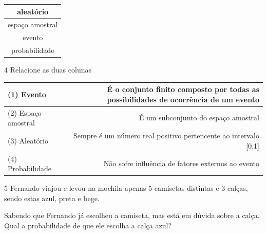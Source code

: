 \begin{escolha}
\begin{escolha}
\begin{escolha}
\begin{escolha}
{\begin{boxmedio}
\begin{boxpeq}
\begin{q°}
\begin{boxmedio}
\begin{boxpeq}
\begin{boxpeq}
\begin{boxmedio}
\begin{boxmedio}
\begin{boxmedio}
\begin{largebox}
\begin{boxmedio}
{\begin{enumerate}
\begin{boxpeq}
{\begin{boxpeq}
\begin{boxpeq}
\begin{boxmedio}
\begin{boxpeq}
\begin{boxpeq}
\begin{boxpeq}
{\begin{boxpeq}
\begin{boxmedio}
\begin{boxpeq}
\begin{boxpeq}
\begin{boxpeq}
\begin{table}[]
\begin{tabular}{|c|}
\hline
aleatório \\ \hline
espaço amostral \\ \hline
evento \\ \hline
probabilidade \\ \hline
\end{tabular}
\end{table}


\num{4} Relacione as duas colunas

\begin{table}[]
\begin{tabular}{|l|r|}
\hline
(1) Evento & É o conjunto finito composto por todas as possibilidades de ocorrência de um evento \\ \hline
(2) Espaço amostral & É um subconjunto do espaço amostral \\ \hline
(3) Aleatório & Sempre é um número real positivo pertencente ao intervalo {[}0,1{]} \\ \hline
(4) Probabilidade & Não sofre influência de fatores externos ao evento \\ \hline
\end{tabular}
\end{table}


\num{5} Fernando viajou e levou na mochila apenas 5 camisetas distintas e 3
calças, sendo estas azul, preta e bege.

Sabendo que Fernando já escolheu a camiseta, mas está em dúvida sobre a
calça. Qual a probabilidade de que ele escolha a calça azul?

\begin{boxpeq}



\end{boxpeq}
\end{boxpeq}
\end{boxpeq}
\end{boxpeq}
\end{boxmedio}
\end{boxpeq}}
\end{boxpeq}
\end{boxpeq}
\end{boxpeq}
\end{boxmedio}
\end{boxpeq}
\end{boxpeq}}
\end{boxpeq}
\end{enumerate}}
\end{boxmedio}
\end{largebox}
\end{boxmedio}
\end{boxmedio}
\end{boxmedio}
\end{boxpeq}
\end{boxpeq}
\end{boxmedio}
\end{q°}
\end{boxpeq}
\end{boxmedio}}
\end{escolha}
\end{escolha}
\end{escolha}
\end{escolha}
